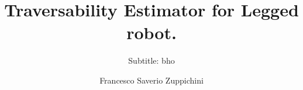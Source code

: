 \documentclass[mscthesis]{usiinfthesis}
\title{Traversability Estimator for Legged robot.} %
\subtitle{Subtitle: bho} %
\author{Francesco Saverio Zuppichini} %
\begin{document}
\maketitle %
\frontmatter %

\begin{acknowledgements}
\end{acknowledgements}

\tableofcontents 





% 






%
%
%
%
\printbibliography
\end{document}
